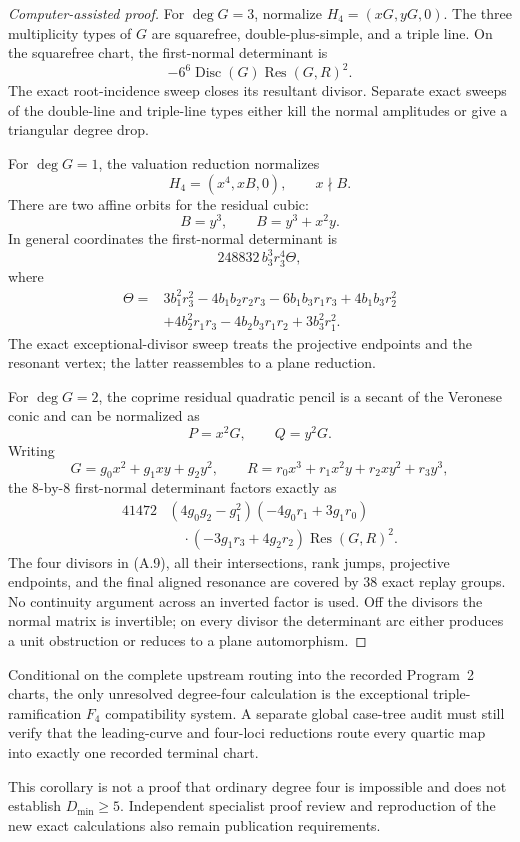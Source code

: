 \begin{proof}[Computer-assisted proof]
For \(\deg G=3\), normalize \(H_4=(xG,yG,0)\).  The three multiplicity
types of \(G\) are squarefree, double-plus-simple, and a triple line.  On
the squarefree chart, the first-normal determinant is
\[
 -6^6\operatorname{Disc}(G)\operatorname{Res}(G,R)^2.
\]
The exact root-incidence sweep closes its resultant divisor.  Separate
exact sweeps of the double-line and triple-line types either kill the normal
amplitudes or give a triangular degree drop.

For \(\deg G=1\), the valuation reduction normalizes
\[
 H_4=(x^4,xB,0),\qquad x\nmid B.
\]
There are two affine orbits for the residual cubic:
\[
 B=y^3,\qquad B=y^3+x^2y.
\]
In general coordinates the first-normal determinant is
\[
 248832\,b_3^3r_3^4\Theta,
\]
where
\[
\begin{aligned}
\Theta={}&3b_1^2r_3^2-4b_1b_2r_2r_3-6b_1b_3r_1r_3
+4b_1b_3r_2^2\\
&+4b_2^2r_1r_3-4b_2b_3r_1r_2+3b_3^2r_1^2.
\end{aligned}
\]
The exact exceptional-divisor sweep treats the projective endpoints and
the resonant vertex; the latter reassembles to a plane reduction.

For \(\deg G=2\), the coprime residual quadratic pencil is a secant of the
Veronese conic and can be normalized as
\[
 P=x^2G,\qquad Q=y^2G.
\]
Writing
\[
 G=g_0x^2+g_1xy+g_2y^2,\qquad
 R=r_0x^3+r_1x^2y+r_2xy^2+r_3y^3,
\]
the \(8\)-by-\(8\) first-normal determinant factors exactly as
\begin{equation}
\begin{aligned}
41472&(4g_0g_2-g_1^2)
(-4g_0r_1+3g_1r_0)\\
&\quad\cdot(-3g_1r_3+4g_2r_2)
\operatorname{Res}(G,R)^2.
\end{aligned}
\tag{A.9}
\end{equation}
The four divisors in (A.9), all their intersections, rank jumps,
projective endpoints, and the final aligned resonance are covered by 38
exact replay groups.  No continuity argument across an inverted factor is
used.  Off the divisors the normal matrix is invertible; on every divisor
the determinant arc either produces a unit obstruction or reduces to a
plane automorphism.
\end{proof}

\begin{corollary}
\label{cor:quartic-revised-frontier}
Conditional on the complete upstream routing into the recorded Program~2
charts, the only unresolved degree-four calculation is the exceptional
triple-ramification \(F_4\) compatibility system.  A separate global
case-tree audit must still verify that the leading-curve and four-loci
reductions route every quartic map into exactly one recorded terminal
chart.
\end{corollary}

This corollary is not a proof that ordinary degree four is impossible and
does not establish \(D_{\min}\ge5\).  Independent specialist proof review
and reproduction of the new exact calculations also remain publication
requirements.
